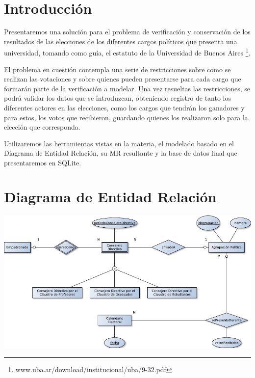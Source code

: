 \documentclass[a4paper, 10pt, twoside]{article}
\begin{document}
\newpage



\section{Introducción}
Presentaremos una solución para el problema de verificación y conservación de los resultados de las elecciones
de los diferentes cargos políticos que presenta una universidad, tomando como guía, el estatuto de la Universidad
de Buenos Aires \footnote{www.uba.ar/download/institucional/uba/9-32.pdf}.

El problema en cuestión contempla una serie de restricciones sobre como se realizan las votaciones y sobre quienes
pueden presentarse para cada cargo que formarán parte de la verificación a modelar. Una vez resueltas las restricciones,
se podrá validar los datos que se introduzcan, obteniendo registro de tanto los diferentes actores en las elecciones, como
los cargos que tendrán los ganadores y para estos, los votos que recibieron, guardando quienes los realizaron solo para la elección
que corresponda.

Utilizaremos las herramientas vistas en la materia, el modelado basado en el Diagrama de Entidad Relación, su
MR resultante y la base de datos final que presentaremos en SQLite.


\newpage




\section{Diagrama de Entidad Relación}

\includegraphics{../diagramas/eleccionesCD.pdf}
\end{document}
